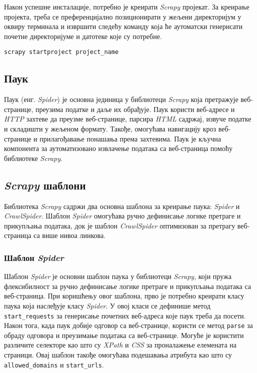 \documentclass[12pt,oneside]{memoir}
\begin{document}
Након успешне инсталације, потребно је креирати \textit{Scrapy} пројекат.
За креирање пројекта, треба се преференцијално позиционирати у жељени директоријум у оквиру терминала и извршити следећу команду која ће аутоматски генерисати почетне директоријуме и датотеке које су потребне.
\begin{verbatim}
scrapy startproject project_name
\end{verbatim}

\subsection{Паук}
Паук (енг. \textit{Spider}) је основна јединица у библиотеци \textit{Scrapy} која претражује веб-странице, преузима податке и даље их обрађује. Паук користи веб-адресе и \textit{HTTP} захтеве да преузме веб-странице, парсира \textit{HTML} садржај, извуче податке и складишти у жељеном формату. Такође, омогућава навигацију кроз веб-странице и прилагођавање понашања према захтевима. Паук је кључна компонента за аутоматизовано извлачење података са веб-страница помоћу библиотеке \textit{Scrapy}.  

\subsection{\textit{Scrapy} шаблони}
Библиотека \textit{Scrapy} садржи два основна шаблона за креирање паука: \textit{Spider} и \textit{CrawlSpider}. Шаблон \textit{Spider} омогућава ручно дефинисање логике претраге и прикупљања података, док је шаблон \textit{CrawlSpider} оптимизован за претрагу веб-страница са више нивоа линкова.

\subsubsection{Шаблон \textit{Spider}}
Шаблон \textit{Spider} је основни шаблон паука у библиотеци \textit{Scrapy}, који пружа флексибилност за ручно дефинисање логике претраге и прикупљања података са веб-страница. При коришћењу овог шаблона, прво је потребно креирати класу паука која наслеђује класу \textit{Spider}. У овој класи се дефинише метод \texttt{start\_requests} за генерисање почетних веб-адреса које паук треба да посети. Након тога, када паук добије одговор са веб-странице, користи се метод \texttt{parse} за обраду одговора и преузимање података са веб-странице. Могуће је користити различите селекторе као што су \textit{XPath} и \textit{CSS} за проналажење елемената на страници. Овај шаблон такође омогућава подешавања атрибута као што су \texttt{allowed\_domains} и \texttt{start\_urls}.
\end{document}
